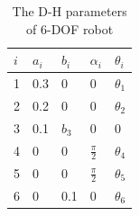 \documentclass[conference]{IEEEtran}
\begin{document}
\begin{table}[htbp]
    \caption{The D-H parameters of 6-DOF robot}
    \def\arraystretch{1.75}
    \begin{center}
        \begin{tabular}{|Y|Y|Y|Y|Y|}
            \hline
            $i$ & $a_i$ & $b_i$ & $\alpha_i$      & $\theta_i$ \\
               & 0.3   & 0     & 0               & $\theta_1$ \\
               & 0.2   & 0     & 0               & $\theta_2$ \\
               & 0.1   & $b_3$ & 0               & 0          \\
               & 0     & 0     & $\frac{\pi}{2}$ & $\theta_4$ \\
               & 0     & 0     & $\frac{\pi}{2}$ & $\theta_5$ \\
               & 0     & 0.1   & 0               & $\theta_6$ \\
            \hline
        \end{tabular}
    \end{center}
\end{table}
\end{document}
